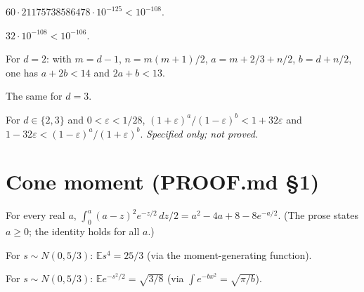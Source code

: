 \begin{lemma}\label{lem:cov}\leanok
$60\cdot 21175738586478\cdot 10^{-125} < 10^{-108}$.
\end{lemma}

\begin{lemma}\label{lem:density}\leanok
$32\cdot 10^{-108}<10^{-106}$.
\end{lemma}

\begin{lemma}\label{lem:budget2}\leanok
For $d=2$: with $m=d-1$, $n=m(m+1)/2$, $a=m+2/3+n/2$, $b=d+n/2$, one has $a+2b<14$ and $2a+b<13$.
\end{lemma}

\begin{lemma}\label{lem:budget3}\leanok
The same for $d=3$.
\end{lemma}

\begin{proposition}\label{prop:ratio-bound}
For $d\in\{2,3\}$ and $0<\varepsilon<1/28$,
$(1+\varepsilon)^a/(1-\varepsilon)^b<1+32\varepsilon$ and $1-32\varepsilon<(1-\varepsilon)^a/(1+\varepsilon)^b$.
\emph{Specified only; not proved.}
\end{proposition}

\chapter{Cone moment (PROOF.md \S1)}

\begin{lemma}\label{lem:cone-integral}\leanok
For every real $a$, $\int_0^a (a-z)^2 e^{-z/2}\,dz/2 = a^2-4a+8-8e^{-a/2}$.
(The prose states $a\ge 0$; the identity holds for all $a$.)
\end{lemma}

\begin{lemma}\label{lem:gaussian-fourth}\leanok
For $s\sim N(0,5/3)$: $\mathbb E s^4=25/3$ (via the moment-generating function).
\end{lemma}

\begin{lemma}\label{lem:gaussian-exp}\leanok
For $s\sim N(0,5/3)$: $\mathbb E e^{-s^2/2}=\sqrt{3/8}$ (via $\int e^{-bx^2}=\sqrt{\pi/b}$).
\end{lemma}

